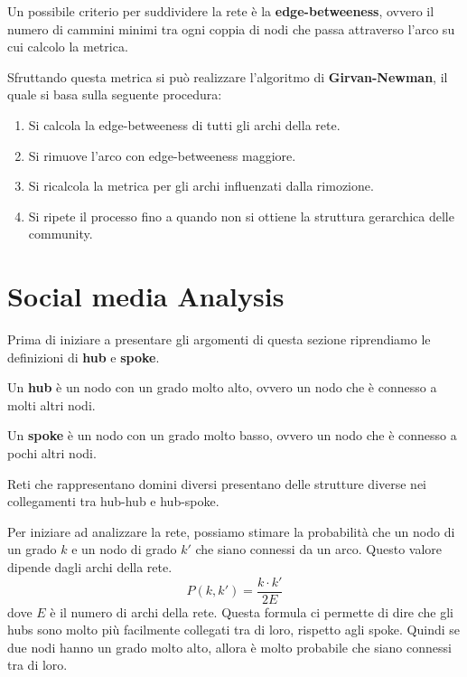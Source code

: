 Un possibile criterio per suddividere la rete è la \textbf{edge-betweeness}, ovvero
il numero di cammini minimi tra ogni coppia di nodi che passa attraverso l'arco
su cui calcolo la metrica.

Sfruttando questa metrica si può realizzare l'algoritmo di \textbf{Girvan-Newman},
il quale si basa sulla seguente procedura:
\begin{enumerate}
    \item Si calcola la edge-betweeness di tutti gli archi della rete.
    \item Si rimuove l'arco con edge-betweeness maggiore.
    \item Si ricalcola la metrica per gli archi influenzati dalla rimozione.
    \item Si ripete il processo fino a quando non si ottiene la struttura gerarchica
          delle community.
\end{enumerate}
\section{Social media Analysis}
Prima di iniziare a presentare gli argomenti di questa sezione riprendiamo
le definizioni di \textbf{hub} e \textbf{spoke}.
\begin{definizione}
    Un \textbf{hub} è un nodo con un grado molto alto, ovvero un nodo che è
    connesso a molti altri nodi.
\end{definizione}
\begin{definizione}
    Un \textbf{spoke} è un nodo con un grado molto basso, ovvero un nodo che è
    connesso a pochi altri nodi.
\end{definizione}
Reti che rappresentano domini diversi presentano delle strutture diverse nei
collegamenti tra hub-hub e hub-spoke.

Per iniziare ad analizzare la rete, possiamo stimare la probabilità che un nodo
di un grado $k$ e un nodo di grado $k'$ che siano connessi da un arco. Questo
valore dipende dagli archi della rete.
\begin{equation}
    P(k, k') = \frac{k \cdot k'}{2E}
\end{equation}
dove $E$ è il numero di archi della rete. Questa formula ci permette di dire che
gli hubs sono molto più facilmente collegati tra di loro, rispetto agli spoke.
Quindi se due nodi hanno un grado molto alto, allora è molto probabile che siano
connessi tra di loro.

